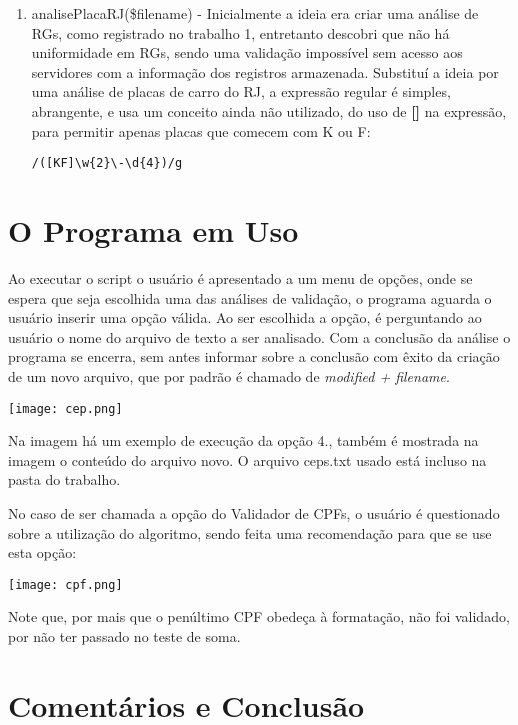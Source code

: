 \documentclass[paper=a4, fontsize=12pt]{scrartcl} %
\numberwithin{equation}{section} %
\numberwithin{figure}{section} %
\numberwithin{table}{section} %
\begin{document}
\begin{enumerate}
\item analisePlacaRJ(\$filename) - Inicialmente a ideia era criar uma análise de RGs, como registrado no trabalho 1, entretanto descobri que não há uniformidade em RGs, sendo uma validação impossível sem acesso aos servidores com a informação dos registros armazenada. Substituí a ideia por uma análise de placas de carro do RJ, a expressão regular é simples, abrangente, e usa um conceito ainda não utilizado, do uso de \textbf{[]} na expressão, para permitir apenas placas que comecem com K ou F:

\begin{verbatim}
/([KF]\w{2}\-\d{4})/g
\end{verbatim}



\end{enumerate}



\section{O Programa em Uso}

Ao executar o script o usuário é apresentado a um menu de opções, onde se espera que seja escolhida uma das análises de validação, o programa aguarda o usuário inserir uma opção válida. Ao ser escolhida a opção, é perguntando ao usuário o nome do arquivo de texto a ser analisado. Com a conclusão da análise o programa se encerra, sem antes informar sobre a conclusão com êxito da criação de um novo arquivo, que por padrão é chamado de \textit{modified + filename}. 


\texttt{[image: cep.png]}


Na imagem há um exemplo de execução da opção 4., também é mostrada na imagem o conteúdo do arquivo novo. O arquivo ceps.txt usado está incluso na pasta do trabalho.

 No caso de ser chamada a opção do Validador de CPFs, o usuário é questionado sobre a utilização do algoritmo, sendo feita uma recomendação para que se use esta opção:

\texttt{[image: cpf.png]}

Note que, por mais que o penúltimo CPF obedeça à formatação, não foi validado, por não ter passado no teste de soma.

\section{Comentários e Conclusão}
\end{document}
